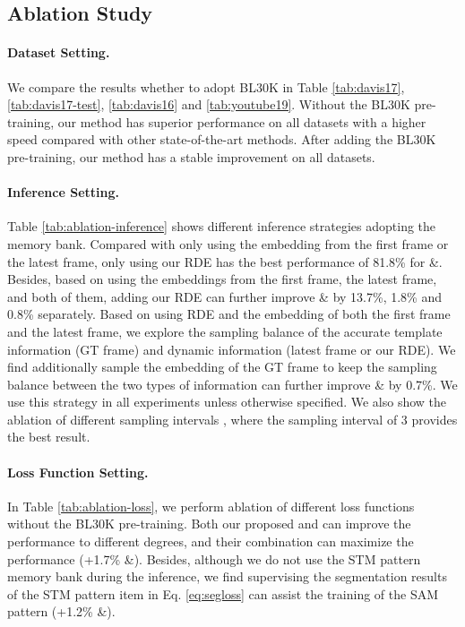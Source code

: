 \documentclass[10pt,twocolumn,letterpaper]{article}
\begin{document}
\subsection{Ablation Study}
\paragraph{Dataset Setting.}
We compare the results whether to adopt BL30K \cite{cheng2021modular} in Table \ref{tab:davis17}, \ref{tab:davis17-test}, \ref{tab:davis16} and \ref{tab:youtube19}. Without the BL30K pre-training, our method has superior performance on all datasets with a higher speed compared with other state-of-the-art methods. After adding the BL30K pre-training, our method has a stable improvement on all datasets.

\paragraph{Inference Setting.}
\label{sec:ablation-inference}
Table \ref{tab:ablation-inference} shows different inference strategies adopting the memory bank. Compared with only using the embedding from the first frame or the latest frame, only using our RDE has the best performance of 81.8\% for {\&}. Besides, based on using the embeddings from the first frame, the latest frame, and both of them, adding our RDE can further improve  {\&} by 13.7\%, 1.8\% and 0.8\% separately.  Based on using RDE and the embedding of both the first frame and the latest frame, we explore the sampling balance of the accurate template information (GT frame) and dynamic information (latest frame or our RDE).  We find additionally sample the embedding of the GT frame to keep the sampling balance between the two types of information can further improve  {\&} by 0.7\%. We use this strategy in all experiments unless otherwise specified.
We also show the ablation of different sampling intervals , where the sampling interval of 3 provides the best result.
\vspace{-0.5em}
\paragraph{Loss Function Setting.}
In Table \ref{tab:ablation-loss}, we perform ablation of different loss functions without the BL30K \cite{cheng2021modular} pre-training. Both our proposed  and   can improve the performance to different degrees, and their combination can maximize the performance (+1.7\% {\&}). Besides, although we do not use the STM pattern memory bank during the inference, we find supervising the segmentation results of the STM pattern item  in Eq. \ref{eq:segloss} can assist the training of the SAM pattern (+1.2\%  {\&}). 
\end{document}
